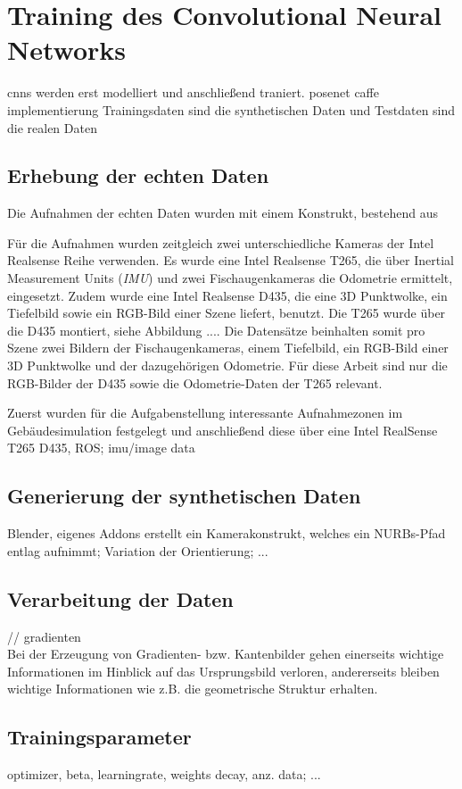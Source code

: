 
\section{Training des Convolutional Neural Networks}
cnns werden erst modelliert und anschließend traniert.
posenet caffe implementierung
Trainingsdaten sind die synthetischen Daten und Testdaten sind die realen Daten

\subsection{Erhebung der echten Daten}

Die Aufnahmen der echten Daten wurden mit einem Konstrukt, bestehend aus 

Für die Aufnahmen wurden zeitgleich zwei unterschiedliche Kameras der Intel Realsense Reihe verwenden. Es wurde eine Intel Realsense T265, die über Inertial Measurement Units (\textit{IMU}) und zwei Fischaugenkameras die Odometrie ermittelt, eingesetzt. Zudem wurde eine Intel Realsense D435, die eine 3D Punktwolke, ein Tiefelbild sowie ein RGB-Bild einer Szene liefert, benutzt. Die T265 wurde über die D435 montiert, siehe Abbildung .... Die Datensätze beinhalten somit pro Szene zwei Bildern der Fischaugenkameras, einem Tiefelbild, ein RGB-Bild einer 3D Punktwolke und der dazugehörigen Odometrie. Für diese Arbeit sind nur die RGB-Bilder der D435 sowie die Odometrie-Daten der T265 relevant.

Zuerst wurden für die Aufgabenstellung interessante Aufnahmezonen im Gebäudesimulation festgelegt und anschließend diese über eine
Intel RealSense T265 D435, ROS; imu/image data


\subsection{Generierung der synthetischen Daten}
Blender,
eigenes Addons erstellt ein Kamerakonstrukt, welches ein NURBs-Pfad entlag aufnimmt; Variation der Orientierung; ...

\subsection{Verarbeitung der Daten}
// gradienten\\
Bei der Erzeugung von Gradienten- bzw. Kantenbilder gehen einerseits wichtige Informationen im Hinblick auf das Ursprungsbild verloren, andererseits bleiben wichtige Informationen wie z.B. die geometrische Struktur erhalten.

\subsection{Trainingsparameter}
optimizer, beta,
learningrate,
weights decay, anz. data; ...